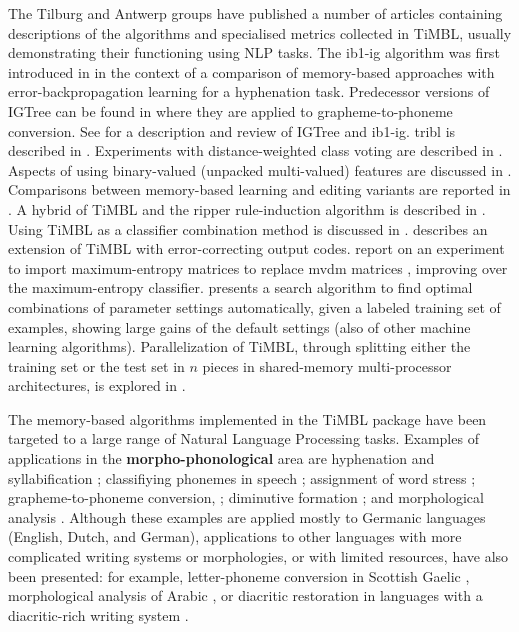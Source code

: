 \documentclass{book}
\begin{document}
The Tilburg and Antwerp groups have published a number of articles
containing descriptions of the algorithms and specialised metrics
collected in TiMBL, usually demonstrating their functioning using NLP
tasks. The {\sc ib1-ig} algorithm was first introduced in
\cite{Daelemans+92b} in the context of a comparison of memory-based
approaches with error-back\-propagation learning for a hyphenation
task.  Predecessor versions of {\sc IGTree} can be found in
\cite{Daelemans+93c,VandenBosch+93} where they are applied to
grapheme-to-phoneme conversion.  See \cite{Daelemans+97} for a
description and review of {\sc IGTree} and {\sc ib1-ig}. {\sc tribl}
is described in \cite{Daelemans+97d}.  Experiments with
distance-weighted class voting are described in
\cite{Zavrel97}. Aspects of using binary-valued (unpacked
multi-valued) features are discussed in \cite{VandenBosch+00}.
Comparisons between memory-based learning and editing variants are
reported in \cite{VandenBosch99,Daelemans+99}. A hybrid of TiMBL and
the {\sc ripper} rule-induction algorithm \cite{Cohen95} is described
in \cite{VandenBosch00,VandenBosch04}. Using TiMBL as a classifier
combination method is discussed in
\cite{Halteren+01}.  describes an extension of
TiMBL with error-correcting output codes. 
report on an experiment to import maximum-entropy matrices to replace
{\sc mvdm} matrices \cite{Hendrickx+04}, improving over the
maximum-entropy classifier.  presents a search
algorithm to find optimal combinations of parameter settings
automatically, given a labeled training set of examples, showing large
gains of the default settings (also of other machine learning
algorithms). Parallelization of TiMBL, through splitting either the
training set or the test set in $n$ pieces in shared-memory
multi-processor architectures, is explored in \cite{VandenBosch+07b}.

The memory-based algorithms implemented in the TiMBL package have been
targeted to a large range of Natural Language Processing
tasks. Examples of applications in the {\bf morpho-phonological} 
area are hyphenation and syllabification \cite{Daelemans+92b};
classifiying phonemes in speech \cite{Kocsor+00}; assignment of word
stress \cite{Daelemans+94}; grapheme-to-phoneme conversion,
\cite{VandenBosch+93,Daelemans+96,Canisius+06}; diminutive formation
\cite{Daelemans+98a}; and morphological analysis
\cite{VandenBosch+96,VandenBosch+99,Canisius+06}. Although these
examples are applied mostly to Germanic languages (English, Dutch, and
German), applications to other languages with more complicated writing
systems or morphologies, or with limited resources, have also been
presented: for example, letter-phoneme conversion in Scottish Gaelic
\cite{Wolters+97}, morphological analysis of Arabic \cite{Marsi+05},
or diacritic restoration in languages with a diacritic-rich writing
system \cite{Mihalcea02,DePauw+07}.
\end{document}
